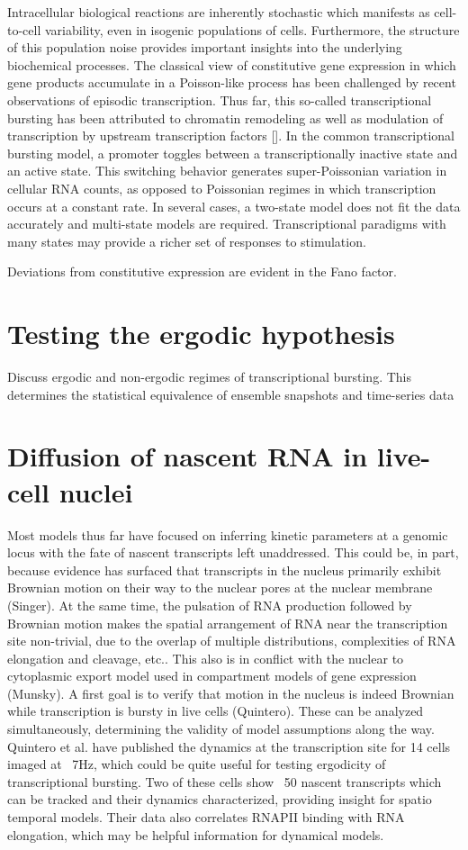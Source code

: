 \documentclass{article}
\begin{document}
Intracellular biological reactions are inherently stochastic which manifests as cell-to-cell variability, even in isogenic populations of cells. Furthermore, 
the structure of this population noise provides important insights into the underlying biochemical processes. The classical view of constitutive gene expression in which gene products accumulate in a Poisson-like process has been challenged by recent observations of episodic transcription. Thus far, this so-called transcriptional bursting has been attributed to chromatin remodeling as well as modulation of transcription by upstream transcription factors []. In the common transcriptional bursting model, a promoter toggles between a transcriptionally inactive state and an active state. This switching behavior generates super-Poissonian variation in cellular RNA counts, as opposed to Poissonian regimes in which transcription occurs at a constant rate. In several cases, a two-state model does not fit the data accurately and multi-state models are required. Transcriptional paradigms with many states may provide a richer set of responses to stimulation. 

Deviations from constitutive expression are evident in the Fano factor. 

\section{Testing the ergodic hypothesis}

Discuss ergodic and non-ergodic regimes of transcriptional bursting. This determines the statistical equivalence of ensemble snapshots and time-series data

\section{Diffusion of nascent RNA in live-cell nuclei}

Most models thus far have focused on inferring kinetic parameters at a genomic locus with the fate of nascent transcripts left unaddressed. This could be, in part, because evidence has surfaced that transcripts in the nucleus primarily exhibit Brownian motion on their way to the nuclear pores at the nuclear membrane (Singer). At the same time, the pulsation of RNA production followed by Brownian motion makes the spatial arrangement of RNA near the transcription site non-trivial, due to the overlap of multiple distributions, complexities of RNA elongation and cleavage, etc.. This also is in conflict with the nuclear to cytoplasmic export model used in compartment models of gene expression (Munsky). A first goal is to verify that motion in the nucleus is indeed Brownian while transcription is bursty in live cells (Quintero). These can be analyzed simultaneously, determining the validity of model assumptions along the way. Quintero et al. have published the dynamics at the transcription site for 14 cells imaged at ~7Hz, which could be quite useful for testing ergodicity of transcriptional bursting. Two of these cells show ~50 nascent transcripts which can be tracked and their dynamics characterized, providing insight for spatio temporal models. Their data also correlates RNAPII binding with RNA elongation, which may be helpful information for dynamical models.
\end{document}
